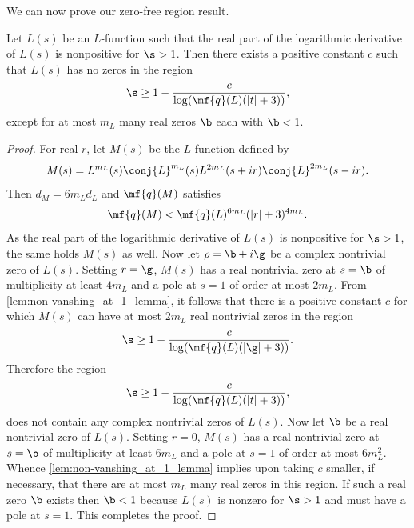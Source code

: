 \documentclass[12pt]{article}
\begin{document}
      We can now prove our zero-free region result.

      \begin{theorem}\label{thm:zero_free_region_generic}
        Let \(L(s)\) be an \(L\)-function such that the real part of the logarithmic derivative of \(L(s)\) is nonpositive for \(\s > 1\). Then there exists a positive constant \(c\) such that \(L(s)\) has no zeros in the region
        \[
          \s \ge 1-\frac{c}{\log(\mf{q}(L)(|t|+3))},
        \]
        except for at most \(m_{L}\) many real zeros \(\b\) each with \(\b < 1\).
      \end{theorem}
      \begin{proof}
        For real \(r\), let \(M(s)\) be the \(L\)-function defined by
        \[
          M(s) = L^{m_{L}}(s)\conj{L}^{m_{L}}(s)L^{2m_{L}}(s+ir)\conj{L}^{2m_{L}}(s-ir).
        \]
        Then \(d_{M} = 6m_{L}d_{L}\) and \(\mf{q}(M)\) satisfies
        \[
          \mf{q}(M) < \mf{q}(L)^{6m_{L}}(|r|+3)^{4m_{L}}.
        \]
        As the real part of the logarithmic derivative of \(L(s)\) is nonpositive for \(\s > 1\), the same holds \(M(s)\) as well. Now let \(\rho = \b+i\g\) be a complex nontrivial zero of \(L(s)\). Setting \(r = \g\), \(M(s)\) has a real nontrivial zero at \(s = \b\) of multiplicity at least \(4m_{L}\) and a pole at \(s = 1\) of order at most \(2m_{L}\). From \cref{lem:non-vanshing_at_1_lemma}, it follows that there is a positive constant \(c\) for which \(M(s)\) can have at most \(2m_{L}\) real nontrivial zeros in the region
        \[
          \s \ge 1-\frac{c}{\log(\mf{q}(L)(|\g|+3))}.
        \]
        Therefore the region
        \[
          \s \ge 1-\frac{c}{\log(\mf{q}(L)(|t|+3))},
        \] 
        does not contain any complex nontrivial zeros of \(L(s)\). Now let \(\b\) be a real nontrivial zero of \(L(s)\). Setting \(r = 0\), \(M(s)\) has a real nontrivial zero at \(s = \b\) of multiplicity at least \(6m_{L}\) and a pole at \(s = 1\) of order at most \(6m_{L}^{2}\). Whence \cref{lem:non-vanshing_at_1_lemma} implies upon taking \(c\) smaller, if necessary, that there are at most \(m_{L}\) many real zeros in this region. If such a real zero \(\b\) exists then \(\b < 1\) because \(L(s)\) is nonzero for \(\s > 1\) and must have a pole at \(s = 1\). This completes the proof.
      \end{proof}
      
\end{document}
